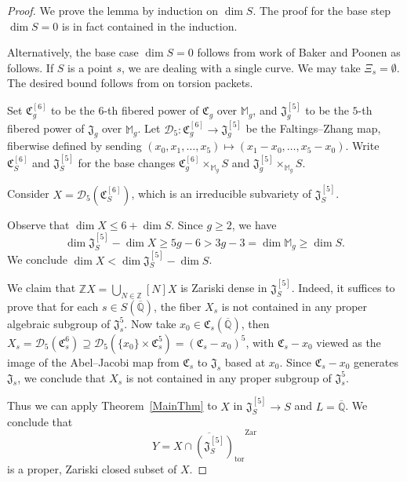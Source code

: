 \documentclass[12pt,oneside]{amsart}
\numberwithin{maincounter}{section}
\numberwithin{equation}{section}
\def\ZZ{\mathbb{Z}}
\def\QQ{\mathbb{Q}}
\newcommand{\IQbar}{{\overline{\QQ}}}
\begin{document}
\begin{proof}
We prove the lemma by induction on $\dim S$. The proof for the base step $\dim S =0$ is in fact contained in the induction.

Alternatively, the base case $\dim S =0$ follows from work of Baker
and Poonen as follows. If $S$ is a point $s$, we are dealing with a single
curve. We may take $\Xi_s=\emptyset$. The desired bound follows from
\cite[Corollary~3]{BakerPoonen:01} on torsion packets.

Set $ \mathfrak{C}_g^{[6]} $ to be the $6$-th fibered power of
$\mathfrak{C}_g$ over $\mathbb{M}_g$, and $\mathfrak{J}_g^{[5]}$ to be
the $5$-th fibered power of $\mathfrak{J}_g$ over $\mathbb{M}_g$. Let
$\mathscr{D}_5 \colon \mathfrak{C}_g^{[6]} \rightarrow
\mathfrak{J}_g^{[5]}$ be the Faltings--Zhang map, fiberwise defined by
sending $(x_0,x_1,\ldots,x_5) \mapsto (x_1-x_0,\ldots,x_5-x_0)$. Write
$\mathfrak{C}_S^{[6]}$ and $\mathfrak{J}_S^{[5]}$ for the base changes
$\mathfrak{C}_g^{[6]}\times_{\mathbb{M}_g}S$ and
$\mathfrak{J}_g^{[5]}\times_{\mathbb{M}_g}S$.


Consider $X= \mathscr{D}_5(\mathfrak{C}_S^{[6]})$, which is an
irreducible subvariety of $\mathfrak{J}_S^{[5]}$.

Observe that $\dim X\le 6+\dim S$. Since $g \ge 2$, we have $$ \dim
{\mathfrak{J}_S^{[5]}} - \dim X \ge 5g-6 > 3g-3 = \dim
\mathbb{M}_g\ge\dim S.$$
We conclude $\dim X < \dim \mathfrak{J}_S^{[5]}-\dim S$.


We claim that $\ZZ X = \bigcup_{N \in \ZZ} [N]X$ is Zariski dense in
$\mathfrak{J}_S^{[5]}$. Indeed, it suffices to prove that for each $s
\in S(\IQbar)$, the fiber $X_s$ is not contained in any proper
algebraic subgroup of $\mathfrak{J}_s^5$. Now take  $x_0 \in \mathfrak{C}_s(\IQbar)$, then $X_s = \mathscr{D}_5(\mathfrak{C}_s^6) \supseteq \mathscr{D}_5(\{x_0\} \times \mathfrak{C}_s^5) = (\mathfrak{C}_s-x_0)^5$, with $\mathfrak{C}_s - x_0$ viewed as the image of the Abel--Jacobi map from $\mathfrak{C}_s$ to $\mathfrak{J}_s$ based at $x_0$. Since $\mathfrak{C}_s - x_0$ generates $\mathfrak{J}_s$, we conclude that $X_s$ is not contained in any proper subgroup of $\mathfrak{J}_s^5$.




Thus we can apply Theorem~\ref{MainThm} to $X$  in
$\mathfrak{J}_S^{[5]} \rightarrow S$ and $L=\IQbar$. We conclude that 
\[
Y = \overline{X \cap (\mathfrak{J}_S^{[5]})_{\mathrm{tor}}}^{\mathrm{Zar}}
\]
is a proper, Zariski closed subset of $X$. 




\end{proof}
\end{document}
